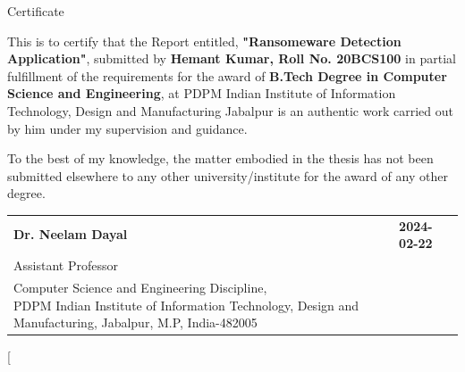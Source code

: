 \documentclass[12pt,twocolumn]{article}
\begin{document}


\begin{titlepage}
    \begin{center}
        \vspace*{1cm}
        
        {\englishtowne \LARGE Certificate}
        
        \vspace{1.2cm}
        
       \large This is to certify that the Report entitled, \textbf{"Ransomeware Detection Application"}, submitted by \textbf{Hemant Kumar, Roll No. 20BCS100} in partial fulfillment of the requirements for the award of \textbf{ B.Tech Degree in Computer Science and Engineering}, at PDPM Indian Institute of Information Technology, Design and Manufacturing Jabalpur is an authentic work carried out by him under my supervision and guidance.
    
    
        To the best of my knowledge, the matter embodied in the thesis has not been submitted elsewhere to any other university/institute for the award of any other degree.
        
        \vfill %

         
    \noindent
    \begin{tabular}{@{}ll@{}}
        \textbf{Dr. Neelam Dayal} & \hfill\textbf{{{2024-02-22}}} \\
        \large Assistant Professor & \\
        \parbox[t]{0.7\textwidth}{%
            Computer Science and Engineering Discipline, \\
            PDPM Indian Institute of Information Technology, Design and Manufacturing, Jabalpur, M.P, India-482005
        }
    \end{tabular}



       \vspace{2cm}
        
    \end{center}
\end{titlepage}



\twocolumn[
\end{document}
